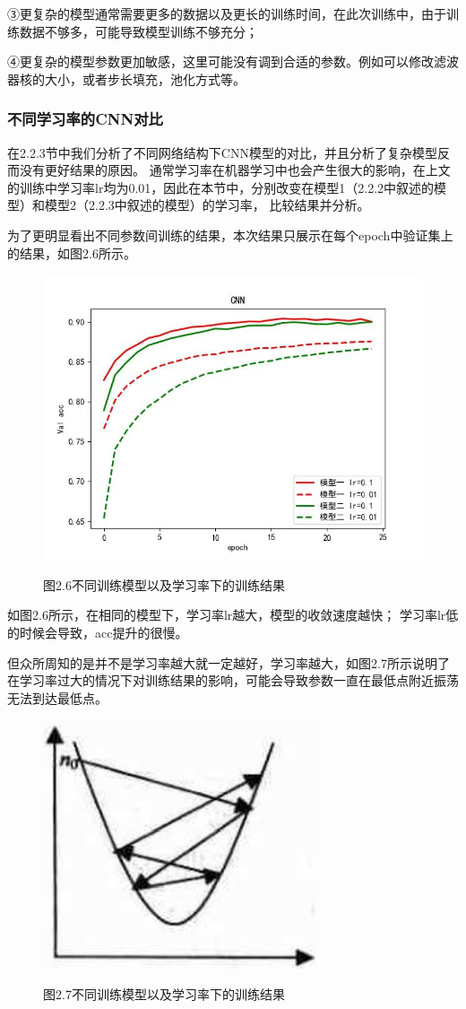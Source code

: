 \documentclass[10.5pt,compsoc,UTF8]{CjC}
\theoremstyle{mystyle}
\begin{document}
③更复杂的模型通常需要更多的数据以及更长的训练时间，在此次训练中，由于训练数据不够多，可能导致模型训练不够充分；

④更复杂的模型参数更加敏感，这里可能没有调到合适的参数。例如可以修改滤波器核的大小，或者步长填充，池化方式等。


\subsubsection{不同学习率的CNN对比}
在2.2.3节中我们分析了不同网络结构下CNN模型的对比，并且分析了复杂模型反而没有更好结果的原因。
通常学习率在机器学习中也会产生很大的影响，在上文的训练中学习率lr均为0.01，因此在本节中，分别改变在模型1（2.2.2中叙述的模型）和模型2（2.2.3中叙述的模型）的学习率，
比较结果并分析。

为了更明显看出不同参数间训练的结果，本次结果只展示在每个epoch中验证集上的结果，如图2.6所示。


\begin{figure}[htbp]
\centering
\vspace {-8mm}
\centerline{\includegraphics[width=0.7\linewidth]{CNN27.jpg}}
\heiti 图2.6\quad  不同训练模型以及学习率下的训练结果
\label{fig1}
\end{figure}

如图2.6所示，在相同的模型下，学习率lr越大，模型的收敛速度越快；
学习率lr低的时候会导致，acc提升的很慢。

但众所周知的是并不是学习率越大就一定越好，学习率越大，如图2.7所示说明了
在学习率过大的情况下对训练结果的影响，可能会导致参数一直在最低点附近振荡
无法到达最低点。

\begin{figure}[htbp]
\centering

\centerline{\includegraphics[width=0.5\linewidth]{CNN28.jpg}}
\heiti 图2.7\quad  不同训练模型以及学习率下的训练结果
\label{fig1}
\end{figure}
\end{document}
